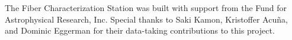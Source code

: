 \documentclass[twocolumn]{emulateapj}
\begin{document}
\acknowledgments

The Fiber Characterization Station was built with support from the Fund for Astrophysical Research, Inc. Special thanks to Saki Kamon, Kristoffer Acu\~na, and Dominic Eggerman for their data-taking contributions to this project.

\end{document}
